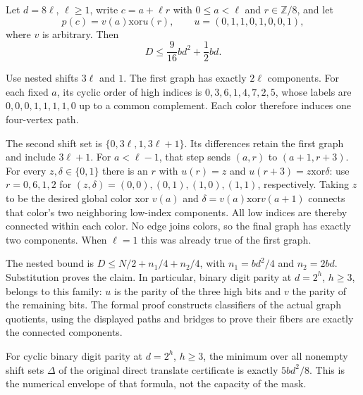 \begin{theorem}\label{thm:structured-mask}
Let $d=8\ell$, $\ell\ge1$, write $c=a+\ell r$ with $0\le a<\ell$ and
$r\in\mathbb Z/8$, and let
\[
 p(c)=v(a)\mathbin{\mathrm{xor}}u(r),\qquad
 u=(0,1,1,0,1,0,0,1),
\]
where $v$ is arbitrary. Then
\[
 D\le\frac9{16}bd^2+\frac12bd.
\]
\end{theorem}

\begin{outline}
Use nested shifts $3\ell$ and $1$. The first graph has exactly $2\ell$
components. For each fixed $a$, its cyclic order of high indices is
$0,3,6,1,4,7,2,5$, whose labels are $0,0,0,1,1,1,1,0$ up to a common
complement. Each color therefore induces one four-vertex path.

The second shift set is $\{0,3\ell,1,3\ell+1\}$. Its differences retain
the first graph and include $3\ell+1$. For $a<\ell-1$, that step sends
$(a,r)$ to $(a+1,r+3)$. For every $z,\delta\in\{0,1\}$ there is an $r$
with $u(r)=z$ and $u(r+3)=z\mathbin{\mathrm{xor}}\delta$: use
$r=0,6,1,2$ for $(z,\delta)=(0,0),(0,1),(1,0),(1,1)$, respectively.
Taking $z$ to be the desired global color xor $v(a)$ and
$\delta=v(a)\mathbin{\mathrm{xor}}v(a+1)$ connects that color's two
neighboring low-index components. All low indices are thereby connected
within each color. No edge joins colors, so the final graph has exactly
two components. When $\ell=1$ this was already true of the first graph.

The nested bound is $D\le N/2+n_1/4+n_2/4$, with
$n_1=bd^2/4$ and $n_2=2bd$. Substitution proves the claim. In particular,
binary digit parity at $d=2^h$, $h\ge3$, belongs to this family: $u$ is
the parity of the three high bits and $v$ the parity of the remaining bits.
The formal proof constructs classifiers of the actual graph quotients,
using the displayed paths and bridges to prove their fibers are exactly
the connected components.
\end{outline}

\begin{proposition}
\label{prop:digit-parity-envelope}
For cyclic binary digit parity at $d=2^h$, $h\ge3$, the minimum over all
nonempty shift sets $\Delta$ of the original direct translate certificate
is exactly $5bd^2/8$. This is the numerical envelope of that formula, not
the capacity of the mask.
\end{proposition}

